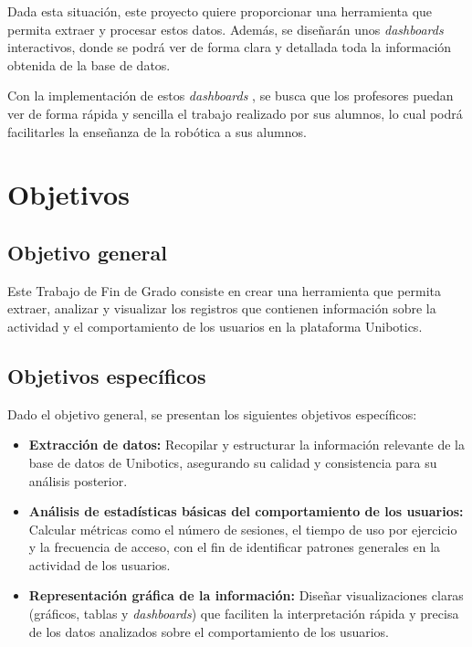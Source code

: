 \documentclass[a4paper, 12pt]{book}
\begin{document}
Dada esta situación, este proyecto quiere proporcionar una herramienta que permita extraer y procesar estos datos. Además, se diseñarán unos \textit{dashboards}  interactivos, donde se podrá ver de forma clara y detallada toda la información obtenida de la base de datos.

Con la implementación de estos \textit{dashboards} , se busca que los profesores puedan ver de forma rápida y sencilla el trabajo realizado por sus alumnos, lo cual podrá facilitarles la enseñanza de la robótica a sus alumnos.

\section{Objetivos}
\label{sec:seccion}

\subsection{Objetivo general}
\label{sec:objetivo-general}

Este Trabajo de Fin de Grado consiste en crear una herramienta que permita extraer, analizar y visualizar los registros que contienen información sobre la actividad y el comportamiento de los usuarios en la plataforma Unibotics.

\subsection{Objetivos específicos}
\label{sec:objetivos-especificos}

Dado el objetivo general, se presentan los siguientes objetivos específicos:

\begin{itemize}
    \item \textbf{Extracción de datos:} Recopilar y estructurar la información relevante de la base de datos de Unibotics, asegurando su calidad y consistencia para su análisis posterior.
    
    \item \textbf{Análisis de estadísticas básicas del comportamiento de los usuarios:} Calcular métricas como el número de sesiones, el tiempo de uso por ejercicio y la frecuencia de acceso, con el fin de identificar patrones generales en la actividad de los usuarios.
    
    \item \textbf{Representación gráfica de la información:} Diseñar visualizaciones claras (gráficos, tablas y \textit{dashboards}) que faciliten la interpretación rápida y precisa de los datos analizados sobre el comportamiento de los usuarios.
\end{itemize}
\end{document}
